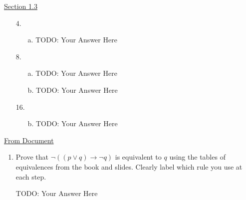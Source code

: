 \documentclass{article}
\begin{document}
\bigskip
\underline{\Large{Section 1.3}}
\begin{itemize}
  \item[4.]
    \begin{itemize}
        \item[a.] {\color{red} TODO: Your Answer Here} 
    \end{itemize}
    \item[]
   \item[8.]
   \begin{itemize}
        \item[a.] {\color{red} TODO: Your Answer Here} 
        \item[b.] {\color{red} TODO: Your Answer Here}
    \end{itemize}
    \item[]
  \item[16.] 
    \begin{itemize}
        \item[b.] {\color{red} TODO: Your Answer Here}
    \end{itemize}

\end{itemize}


\bigskip
\underline{\Large{From Document}}
\begin{enumerate}
    \item Prove that $\neg ((p\lor q)\to \neg q)$ is equivalent to $q$ using the tables of equivalences from the book and slides.  Clearly label which rule you use at each step.  
    
     {\color{red} TODO: Your Answer Here}
\end{enumerate}
\end{document}
